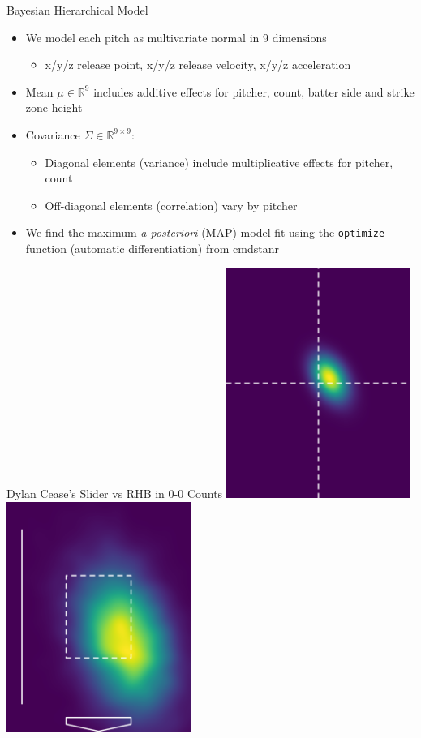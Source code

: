 \documentclass{beamer}
\begin{document}
  \begin{frame}{Bayesian Hierarchical Model}
    \begin{itemize}
      \item We model each pitch as multivariate normal in 9 dimensions
      \begin{itemize}
        \item x/y/z release point, x/y/z release velocity, x/y/z acceleration
      \end{itemize}
      \item Mean $\mu \in \mathbb{R}^9$ includes additive effects for pitcher, count, batter side and strike zone height
      \item Covariance $\Sigma \in \mathbb{R}^{9 \times 9}$:
      \begin{itemize}
        \item Diagonal elements (variance) include multiplicative effects for pitcher, count
        \item Off-diagonal elements (correlation) vary by pitcher
      \end{itemize}
      \item We find the maximum {\it a posteriori} (MAP) model fit using the \texttt{optimize} function (automatic differentiation) from cmdstanr
    \end{itemize}
  \end{frame}

  \begin{frame}{Dylan Cease's Slider vs RHB in 0-0 Counts}
    \includegraphics[width = 0.45\textwidth]{images/656302_SL_R_0_0_break.png}
    \hfill
    \includegraphics[width = 0.45\textwidth]{images/656302_SL_R_0_0_plate.png}
  \end{frame}
\end{document}
